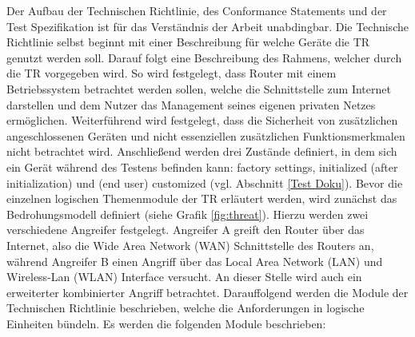 \documentclass[a4paper]{book}
\begin{document}
\begin{large}
\begin{onehalfspace}
\indent Der Aufbau der Technischen Richtlinie, des \glqq Conformance Statements\grqq{} und der Test Spezifikation ist für das Verständnis der Arbeit unabdingbar. Die Technische Richtlinie selbst beginnt mit einer Beschreibung für welche Geräte die TR genutzt werden soll. Darauf folgt eine Beschreibung des Rahmens, welcher durch die TR vorgegeben wird. So wird festgelegt, dass Router mit einem Betriebssystem betrachtet werden sollen, welche die Schnittstelle zum Internet darstellen und dem Nutzer das Management seines eigenen privaten Netzes ermöglichen. Weiterführend wird festgelegt, dass die Sicherheit von zusätzlichen angeschlossenen Geräten und nicht essenziellen zusätzlichen Funktionsmerkmalen nicht betrachtet wird. Anschließend werden drei Zustände definiert, in dem sich ein Gerät während des Testens befinden kann: \glqq factory settings\grqq , \glqq initialized (after initialization)\grqq{} und \glqq (end user) customized\grqq{} (vgl. Abschnitt \ref{Test Doku}). Bevor die einzelnen logischen Themenmodule der TR erläutert werden, wird zunächst das Bedrohungsmodell definiert (siehe Grafik \ref{fig:threat}). Hierzu werden zwei verschiedene Angreifer festgelegt. Angreifer A greift den Router über das Internet, also die \glqq Wide Area Network\grqq{} (WAN)  Schnittstelle des Routers an, während Angreifer B einen Angriff über das \glqq Local Area Network\grqq{} (LAN) und \glqq Wireless-Lan\grqq{} (WLAN) Interface versucht. An dieser Stelle wird auch ein erweiterter kombinierter Angriff betrachtet. Darauffolgend werden die Module der Technischen Richtlinie beschrieben, welche die Anforderungen in logische Einheiten bündeln. Es werden die folgenden Module beschrieben:
\end{onehalfspace}


\end{large}
\end{document}
